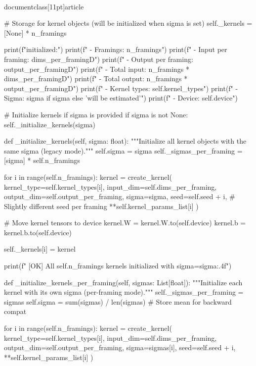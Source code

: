 \\documentclass[11pt]{article}
\begin{document}
\begin{CodeBlock}
        # Storage for kernel objects (will be initialized when sigma is set)
        self._kernels = [None] * n_framings
        
        print(f"\nMultiFramingRKS initialized:")
        print(f"  - Framings: {n_framings}")
        print(f"  - Input per framing: {dims_per_framing}D")
        print(f"  - Output per framing: {output_per_framing}D")
        print(f"  - Total input: {n_framings * dims_per_framing}D")
        print(f"  - Total output: {n_framings * output_per_framing}D")
        print(f"  - Kernel types: {self.kernel_types}")
        print(f"  - Sigma: {sigma if sigma else 'will be estimated'}")
        print(f"  - Device: {self.device}")
        
        # Initialize kernels if sigma is provided
        if sigma is not None:
            self._initialize_kernels(sigma)
    
    def _initialize_kernels(self, sigma: float):
        """Initialize all kernel objects with the same sigma (legacy mode)."""
        self.sigma = sigma
        self._sigmas_per_framing = [sigma] * self.n_framings

        for i in range(self.n_framings):
            kernel = create_kernel(
                kernel_type=self.kernel_types[i],
                input_dim=self.dims_per_framing,
                output_dim=self.output_per_framing,
                sigma=sigma,
                seed=self.seed + i,  # Slightly different seed per framing
                **self.kernel_params_list[i]
            )

            # Move kernel tensors to device
            kernel.W = kernel.W.to(self.device)
            kernel.b = kernel.b.to(self.device)

            self._kernels[i] = kernel

        print(f"  [OK] All {self.n_framings} kernels initialized with sigma={sigma:.4f}")

    def _initialize_kernels_per_framing(self, sigmas: List[float]):
        """Initialize each kernel with its own sigma (per-framing mode)."""
        self._sigmas_per_framing = sigmas
        self.sigma = sum(sigmas) / len(sigmas)  # Store mean for backward compat

        for i in range(self.n_framings):
            kernel = create_kernel(
                kernel_type=self.kernel_types[i],
                input_dim=self.dims_per_framing,
                output_dim=self.output_per_framing,
                sigma=sigmas[i],
                seed=self.seed + i,
                **self.kernel_params_list[i]
            )


\end{CodeBlock}
\end{document}
